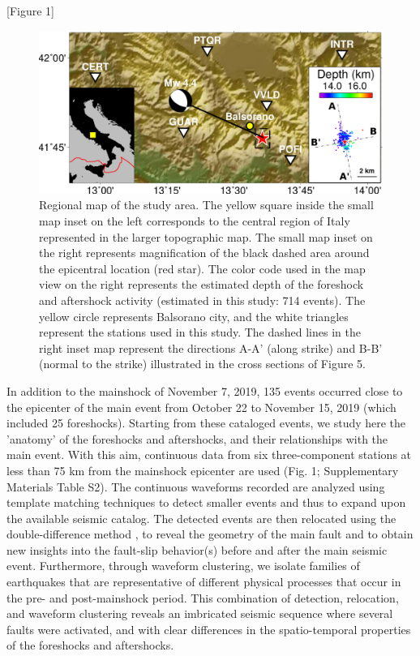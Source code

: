 \documentclass[a4paper,12pt,twoside]{article}
\begin{document}
\begin{center}
   [Figure 1]
\end{center}


\begin{figure}
    \centering
     \includegraphics[width=1\linewidth]{map_balsorano.pdf}
    \caption{Regional map of the study area. The yellow square inside the small map inset on the left corresponds to the central region of Italy represented in the larger topographic map. The small map inset on the right represents magnification of the black dashed area around the epicentral location (red star). The color code used in the map view on the right represents the estimated depth of the foreshock and aftershock activity (estimated in this study: 714 events). The yellow circle represents Balsorano city, and the white triangles represent the stations used in this study. The dashed lines in the right inset map represent the directions A-A' (along strike) and B-B' (normal to the strike) illustrated in the cross sections of Figure 5.}
\end{figure}    \label{fig:general_map}

In addition to the mainshock of November 7, 2019, 135 events occurred close to the epicenter of the main event from October 22 to November 15, 2019 (which included 25 foreshocks). Starting from these cataloged events, we study here the 'anatomy' of the foreshocks and aftershocks, and their relationships with the main event. With this aim, continuous data from six three-component stations at less than 75 km from the mainshock epicenter are used (Fig. 1; Supplementary Materials Table S2). The continuous waveforms recorded are analyzed using template matching techniques \citep{Gibbons_2006_DLM, Shelly_2007_CET} to detect smaller events and thus to expand upon the available seismic catalog. The detected events are then relocated using the double-difference method \citep{Waldhauser_2001_HDD}, to reveal the geometry of the main fault and to obtain new insights into the fault-slip behavior(s) before and after the main seismic event. Furthermore, through waveform clustering, we isolate families of earthquakes that are representative of different physical processes that occur in the pre- and post-mainshock period. This combination of detection, relocation, and waveform clustering reveals an imbricated seismic sequence where several faults were activated, and with clear differences in the spatio-temporal properties of the foreshocks and aftershocks.
\end{document}

